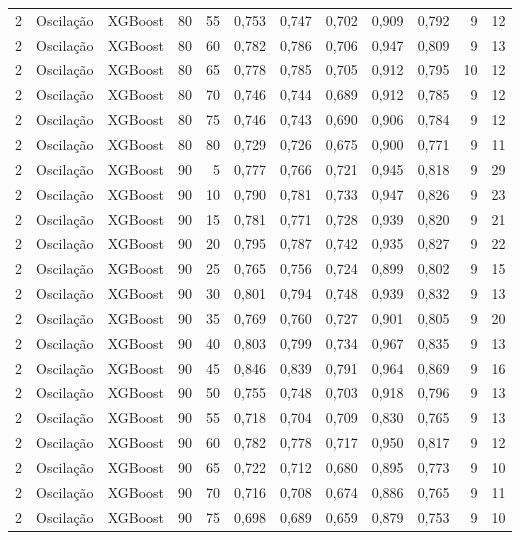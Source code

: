 \begin{longtable}{@{}rllrrrrrrrrr@{}}
2 & Oscilação & XGBoost & 80 & 55 & 0,753 & 0,747 & 0,702 & 0,909 & 0,792 & 9 & 12 \\
2 & Oscilação & XGBoost & 80 & 60 & 0,782 & 0,786 & 0,706 & 0,947 & 0,809 & 9 & 13 \\
2 & Oscilação & XGBoost & 80 & 65 & 0,778 & 0,785 & 0,705 & 0,912 & 0,795 & 10 & 12 \\
2 & Oscilação & XGBoost & 80 & 70 & 0,746 & 0,744 & 0,689 & 0,912 & 0,785 & 9 & 12 \\
2 & Oscilação & XGBoost & 80 & 75 & 0,746 & 0,743 & 0,690 & 0,906 & 0,784 & 9 & 12 \\
2 & Oscilação & XGBoost & 80 & 80 & 0,729 & 0,726 & 0,675 & 0,900 & 0,771 & 9 & 11 \\
2 & Oscilação & XGBoost & 90 & 5 & 0,777 & 0,766 & 0,721 & 0,945 & 0,818 & 9 & 29 \\
2 & Oscilação & XGBoost & 90 & 10 & 0,790 & 0,781 & 0,733 & 0,947 & 0,826 & 9 & 23 \\
2 & Oscilação & XGBoost & 90 & 15 & 0,781 & 0,771 & 0,728 & 0,939 & 0,820 & 9 & 21 \\
2 & Oscilação & XGBoost & 90 & 20 & 0,795 & 0,787 & 0,742 & 0,935 & 0,827 & 9 & 22 \\
2 & Oscilação & XGBoost & 90 & 25 & 0,765 & 0,756 & 0,724 & 0,899 & 0,802 & 9 & 15 \\
2 & Oscilação & XGBoost & 90 & 30 & 0,801 & 0,794 & 0,748 & 0,939 & 0,832 & 9 & 13 \\
2 & Oscilação & XGBoost & 90 & 35 & 0,769 & 0,760 & 0,727 & 0,901 & 0,805 & 9 & 20 \\
2 & Oscilação & XGBoost & 90 & 40 & 0,803 & 0,799 & 0,734 & 0,967 & 0,835 & 9 & 13 \\
2 & Oscilação & XGBoost & 90 & 45 & 0,846 & 0,839 & 0,791 & 0,964 & 0,869 & 9 & 16 \\
2 & Oscilação & XGBoost & 90 & 50 & 0,755 & 0,748 & 0,703 & 0,918 & 0,796 & 9 & 13 \\
2 & Oscilação & XGBoost & 90 & 55 & 0,718 & 0,704 & 0,709 & 0,830 & 0,765 & 9 & 13 \\
2 & Oscilação & XGBoost & 90 & 60 & 0,782 & 0,778 & 0,717 & 0,950 & 0,817 & 9 & 12 \\
2 & Oscilação & XGBoost & 90 & 65 & 0,722 & 0,712 & 0,680 & 0,895 & 0,773 & 9 & 10 \\
2 & Oscilação & XGBoost & 90 & 70 & 0,716 & 0,708 & 0,674 & 0,886 & 0,765 & 9 & 11 \\
2 & Oscilação & XGBoost & 90 & 75 & 0,698 & 0,689 & 0,659 & 0,879 & 0,753 & 9 & 10 \\

\end{longtable}
